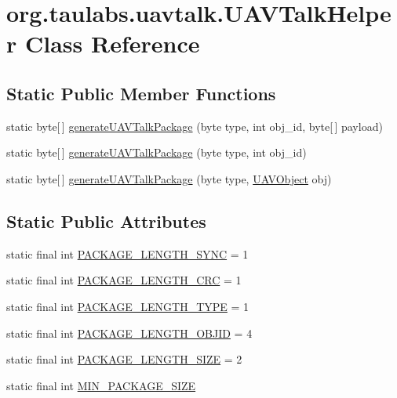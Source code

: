\hypertarget{classorg_1_1taulabs_1_1uavtalk_1_1_u_a_v_talk_helper}{\section{org.\-taulabs.\-uavtalk.\-U\-A\-V\-Talk\-Helper \-Class \-Reference}
\label{classorg_1_1taulabs_1_1uavtalk_1_1_u_a_v_talk_helper}
}
\subsection*{\-Static \-Public \-Member \-Functions}
\begin{DoxyCompactItemize}
\item 
static byte\mbox{[}$\,$\mbox{]} \hyperlink{classorg_1_1taulabs_1_1uavtalk_1_1_u_a_v_talk_helper_afb6d3dab28b1ad2775252c7965dfde46}{generate\-U\-A\-V\-Talk\-Package} (byte type, int obj\-\_\-id, byte\mbox{[}$\,$\mbox{]} payload)
\item 
static byte\mbox{[}$\,$\mbox{]} \hyperlink{classorg_1_1taulabs_1_1uavtalk_1_1_u_a_v_talk_helper_a32d83d07f5f1c0768d424c09d4ad41d4}{generate\-U\-A\-V\-Talk\-Package} (byte type, int obj\-\_\-id)
\item 
static byte\mbox{[}$\,$\mbox{]} \hyperlink{classorg_1_1taulabs_1_1uavtalk_1_1_u_a_v_talk_helper_a83c7df5977d039ac81d0b807bb8419c4}{generate\-U\-A\-V\-Talk\-Package} (byte type, \hyperlink{classorg_1_1taulabs_1_1uavtalk_1_1_u_a_v_object}{\-U\-A\-V\-Object} obj)
\end{DoxyCompactItemize}
\subsection*{\-Static \-Public \-Attributes}
\begin{DoxyCompactItemize}
\item 
static final int \hyperlink{classorg_1_1taulabs_1_1uavtalk_1_1_u_a_v_talk_helper_ab11d89e3277ccd5635a8680386201385}{\-P\-A\-C\-K\-A\-G\-E\-\_\-\-L\-E\-N\-G\-T\-H\-\_\-\-S\-Y\-N\-C} = 1
\item 
static final int \hyperlink{classorg_1_1taulabs_1_1uavtalk_1_1_u_a_v_talk_helper_ad84005b472609cb580ad2741721d4b72}{\-P\-A\-C\-K\-A\-G\-E\-\_\-\-L\-E\-N\-G\-T\-H\-\_\-\-C\-R\-C} = 1
\item 
static final int \hyperlink{classorg_1_1taulabs_1_1uavtalk_1_1_u_a_v_talk_helper_a2f030393c6a563452702a5d1c0cc06fd}{\-P\-A\-C\-K\-A\-G\-E\-\_\-\-L\-E\-N\-G\-T\-H\-\_\-\-T\-Y\-P\-E} = 1
\item 
static final int \hyperlink{classorg_1_1taulabs_1_1uavtalk_1_1_u_a_v_talk_helper_a1c9fe1427e747df427714555bef558f4}{\-P\-A\-C\-K\-A\-G\-E\-\_\-\-L\-E\-N\-G\-T\-H\-\_\-\-O\-B\-J\-I\-D} = 4
\item 
static final int \hyperlink{classorg_1_1taulabs_1_1uavtalk_1_1_u_a_v_talk_helper_a3429fe1986e7f1fcafdb366cb2cff77b}{\-P\-A\-C\-K\-A\-G\-E\-\_\-\-L\-E\-N\-G\-T\-H\-\_\-\-S\-I\-Z\-E} = 2
\item 
static final int \hyperlink{classorg_1_1taulabs_1_1uavtalk_1_1_u_a_v_talk_helper_acca7dfc119249e6cd79ce3f4f2a0c980}{\-M\-I\-N\-\_\-\-P\-A\-C\-K\-A\-G\-E\-\_\-\-S\-I\-Z\-E}
\end{DoxyCompactItemize}


